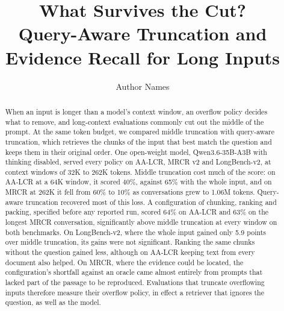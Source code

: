 \documentclass[letterpaper]{article} %
\title{What Survives the Cut?\\Query-Aware Truncation and Evidence Recall for Long Inputs}
\author{
    Author Names
}
\begin{document}
\maketitle

\begin{abstract}
When an input is longer than a model's context window, an overflow policy decides what to remove, and long-context evaluations commonly cut out the middle of the prompt. At the same token budget, we compared middle truncation with query-aware truncation, which retrieves the chunks of the input that best match the question and keeps them in their original order. One open-weight model, Qwen3.6-35B-A3B with thinking disabled, served every policy on AA-LCR, MRCR v2 and LongBench-v2, at context windows of 32K to 262K tokens. Middle truncation cost much of the score: on AA-LCR at a 64K window, it scored 40\%, against 65\% with the whole input, and on MRCR at 262K it fell from 60\% to 10\% as conversations grew to 1.06M tokens. Query-aware truncation recovered most of this loss. A configuration of chunking, ranking and packing, specified before any reported run, scored 64\% on AA-LCR and 63\% on the longest MRCR conversation, significantly above middle truncation at every window on both benchmarks. On LongBench-v2, where the whole input gained only 5.9 points over middle truncation, its gains were not significant. Ranking the same chunks without the question gained less, although on AA-LCR keeping text from every document also helped. On MRCR, where the evidence could be located, the configuration's shortfall against an oracle came almost entirely from prompts that lacked part of the passage to be reproduced. Evaluations that truncate overflowing inputs therefore measure their overflow policy, in effect a retriever that ignores the question, as well as the model.
\end{abstract}

\end{document}
